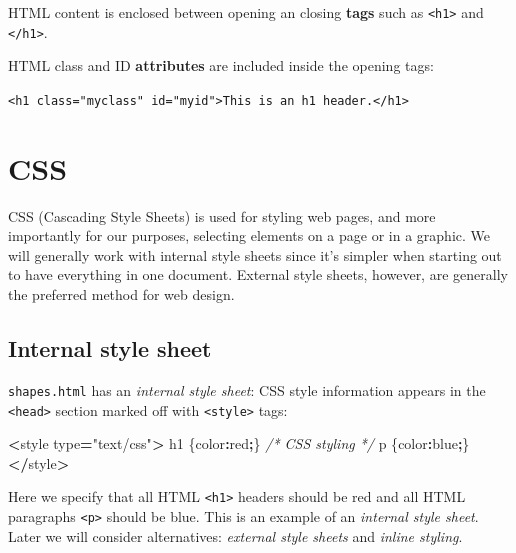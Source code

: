 \documentclass[
  openany]{book}
\newenvironment{Shaded}{\begin{snugshade}}{\end{snugshade}}
\newcommand{\CommentTok}[1]{\textcolor[rgb]{0.56,0.35,0.01}{\textit{#1}}}
\newcommand{\DataTypeTok}[1]{\textcolor[rgb]{0.13,0.29,0.53}{#1}}
\newcommand{\NormalTok}[1]{#1}
\newcommand{\OperatorTok}[1]{\textcolor[rgb]{0.81,0.36,0.00}{\textbf{#1}}}
\newcommand{\StringTok}[1]{\textcolor[rgb]{0.31,0.60,0.02}{#1}}
\begin{document}
HTML content is enclosed between opening an closing \textbf{tags} such as \texttt{\textless{}h1\textgreater{}} and \texttt{\textless{}/h1\textgreater{}}.

HTML class and ID \textbf{attributes} are included inside the opening tags:

\texttt{\textless{}h1\ class="myclass"\ id="myid"\textgreater{}This\ is\ an\ h1\ header.\textless{}/h1\textgreater{}}

\hypertarget{css}{%
\section{\texorpdfstring{CSS }{CSS }}\label{css}}

CSS (Cascading Style Sheets) is used for styling web pages, and more importantly for our purposes, selecting elements on a page or in a graphic. We will generally work with internal style sheets since it's simpler when starting out to have everything in one document. External style sheets, however, are generally the preferred method for web design.

\hypertarget{internal-style-sheet}{%
\subsection{Internal style sheet}\label{internal-style-sheet}}

\texttt{shapes.html} has an \emph{internal style sheet}: CSS style information appears in the \texttt{\textless{}head\textgreater{}} section marked off with \texttt{\textless{}style\textgreater{}} tags:

\begin{Shaded}
\begin{Highlighting}[]
\OperatorTok{\textless{}}\NormalTok{style type}\OperatorTok{=}\StringTok{"text/css"}\OperatorTok{\textgreater{}}
\NormalTok{    h1 \{}\DataTypeTok{color}\OperatorTok{:}\NormalTok{red}\OperatorTok{;}\NormalTok{\}     }\CommentTok{/* CSS styling */}
\NormalTok{    p \{}\DataTypeTok{color}\OperatorTok{:}\NormalTok{blue}\OperatorTok{;}\NormalTok{\}}
\OperatorTok{\textless{}/}\NormalTok{style}\OperatorTok{\textgreater{}}
\end{Highlighting}
\end{Shaded}

Here we specify that all HTML \texttt{\textless{}h1\textgreater{}} headers should be red and all HTML paragraphs \texttt{\textless{}p\textgreater{}} should be blue. This is an example of an \emph{internal style sheet}. Later we will consider alternatives: \emph{external style sheets} and \emph{inline styling}.
\end{document}

